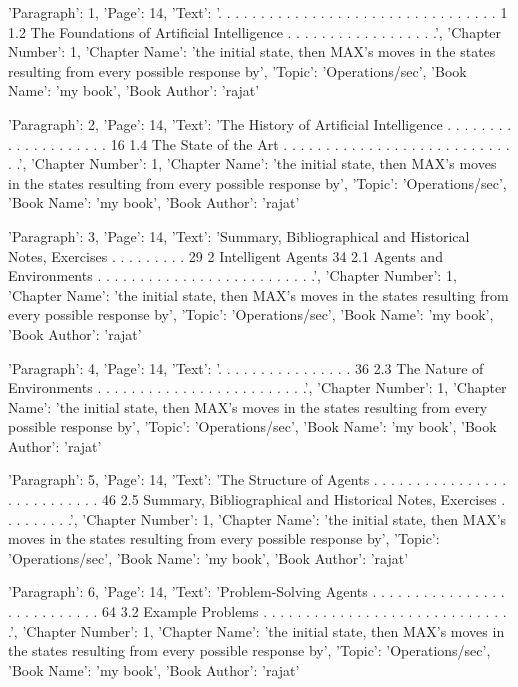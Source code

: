 {'Paragraph': 1, 'Page': 14, 'Text': '. . . . . . . . . . . . . . . . . . . . . . . . . . . . . . . . . 1 1.2 The Foundations of Artiﬁcial Intelligence . . . . . . . . . . . . . . . . . .', 'Chapter Number': 1, 'Chapter Name': 'the initial state, then MAX’s moves in the states resulting from every possible response by', 'Topic': 'Operations/sec', 'Book Name': 'my book', 'Book Author': 'rajat'}

{'Paragraph': 2, 'Page': 14, 'Text': 'The History of Artiﬁcial Intelligence . . . . . . . . . . . . . . . . . . . . 16 1.4 The State of the Art . . . . . . . . . . . . . . . . . . . . . . . . . . . . .', 'Chapter Number': 1, 'Chapter Name': 'the initial state, then MAX’s moves in the states resulting from every possible response by', 'Topic': 'Operations/sec', 'Book Name': 'my book', 'Book Author': 'rajat'}

{'Paragraph': 3, 'Page': 14, 'Text': 'Summary, Bibliographical and Historical Notes, Exercises . . . . . . . . . 29 2 Intelligent Agents 34 2.1 Agents and Environments . . . . . . . . . . . . . . . . . . . . . . . . . .', 'Chapter Number': 1, 'Chapter Name': 'the initial state, then MAX’s moves in the states resulting from every possible response by', 'Topic': 'Operations/sec', 'Book Name': 'my book', 'Book Author': 'rajat'}

{'Paragraph': 4, 'Page': 14, 'Text': '. . . . . . . . . . . . . . . . 36 2.3 The Nature of Environments . . . . . . . . . . . . . . . . . . . . . . . . .', 'Chapter Number': 1, 'Chapter Name': 'the initial state, then MAX’s moves in the states resulting from every possible response by', 'Topic': 'Operations/sec', 'Book Name': 'my book', 'Book Author': 'rajat'}

{'Paragraph': 5, 'Page': 14, 'Text': 'The Structure of Agents . . . . . . . . . . . . . . . . . . . . . . . . . . . 46 2.5 Summary, Bibliographical and Historical Notes, Exercises . . . . . . . . .', 'Chapter Number': 1, 'Chapter Name': 'the initial state, then MAX’s moves in the states resulting from every possible response by', 'Topic': 'Operations/sec', 'Book Name': 'my book', 'Book Author': 'rajat'}

{'Paragraph': 6, 'Page': 14, 'Text': 'Problem-Solving Agents . . . . . . . . . . . . . . . . . . . . . . . . . . . 64 3.2 Example Problems . . . . . . . . . . . . . . . . . . . . . . . . . . . . . .', 'Chapter Number': 1, 'Chapter Name': 'the initial state, then MAX’s moves in the states resulting from every possible response by', 'Topic': 'Operations/sec', 'Book Name': 'my book', 'Book Author': 'rajat'}

